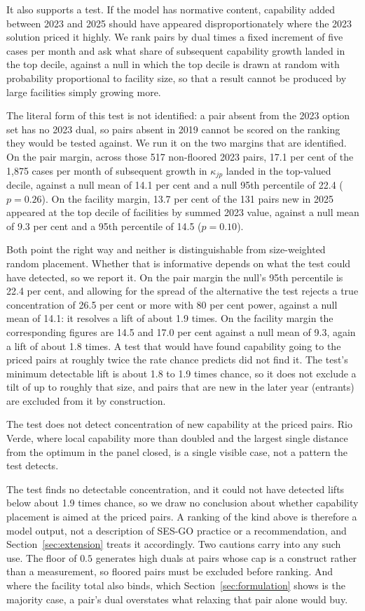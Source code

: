 It also supports a test. If the model has normative content, capability added
between 2023 and 2025 should have appeared disproportionately where the 2023
solution priced it highly. We rank pairs by dual times a fixed increment of five
cases per month and ask what share of subsequent capability growth landed in the
top decile, against a null in which the top decile is drawn at random with
probability proportional to facility size, so that a result cannot be produced by
large facilities simply growing more.

The literal form of this test is not identified: a pair absent from the 2023
option set has no 2023 dual, so pairs absent in 2019 cannot be scored on the
ranking they would be tested against. We run it on the two margins that are
identified. On the pair margin, across those 517 non-floored 2023 pairs, 17.1 per
cent of the 1{,}875 cases per month of subsequent growth in $\kappa_{jp}$ landed
in the top-valued decile, against a null mean of 14.1 per cent and a null 95th
percentile of 22.4 ($p = 0.26$). On the facility margin, 13.7 per cent of the 131
pairs new in 2025 appeared at the top decile of facilities by summed 2023 value,
against a null mean of 9.3 per cent and a 95th percentile of 14.5 ($p = 0.10$).

Both point the right way and neither is distinguishable from size-weighted random
placement. Whether that is informative depends on what the test could have
detected, so we report it. On the pair margin the null's 95th percentile is 22.4
per cent, and allowing for the spread of the alternative the test rejects a true
concentration of 26.5 per cent or more with 80 per cent power, against a null mean
of 14.1: it resolves a lift of about 1.9 times. On the facility margin the
corresponding figures are 14.5 and 17.0 per cent against a null mean of 9.3, again
a lift of about 1.8 times. A test that would have found capability going to the
priced pairs at roughly twice the rate chance predicts did not find it. The test's minimum detectable lift is about 1.8 to 1.9 times chance, so it does not exclude
a tilt of up to roughly that size, and pairs that are new in the later year (entrants) are excluded from it
by construction.

The test does not detect concentration of new capability at the priced pairs. Rio Verde, where local capability
more than doubled and the largest single distance from the optimum in the panel closed, is a single visible case, not a pattern the test detects.

The test finds no detectable concentration, and it could not have detected lifts below about 1.9 times chance, so we draw no conclusion about whether capability placement is aimed at the priced pairs. A ranking of the kind above
is therefore a model output, not a description of SES-GO practice or a recommendation, and Section~\ref{sec:extension} treats it accordingly.
Two cautions carry into any such use. The floor of $0.5$ generates high duals at
pairs whose cap is a construct rather than a measurement, so floored pairs must be
excluded before ranking. And where the facility total also binds, which
Section~\ref{sec:formulation} shows is the majority case, a pair's dual overstates what
relaxing that pair alone would buy.


